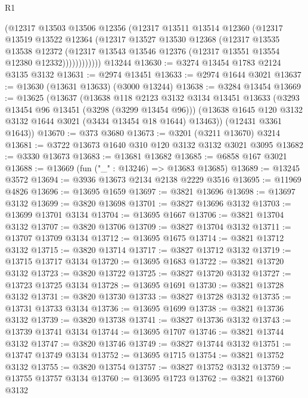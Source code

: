 \begin{lexlean}{R1}
\begin{coremodule}
              (@12317
                @13503
                @13506
                @12356
                (@12317
                  @13511
                  @13514
                  @12360
                  (@12317
                    @13519
                    @13522
                    @12364
                    (@12317
                      @13527
                      @13530
                      @12368
                      (@12317
                        @13535
                        @13538
                        @12372
                        (@12317 @13543 @13546 @12376 (@12317 @13551 @13554 @12380 @12332))))))))))))
    @13244
@13630 := @3274 @13454 @1783 @2124 @3135 @3132
@13631 := @2974 @13451
@13633 := @2974 @1644 @3021
@13637 := @13630 (@13631 @13633) (@3000 @13244)
@13638 := @3284 @13454
@13669 := @13625
    (@13637
      (@13638
        @118
        @2123
        @3132
        @3134
        @13451
        @13633
        (@3293 @13454 @96 @13451 (@3298 (@3299 @13454 @96)))
        (@13638 @1645 @120 @3132 @3132 @1644 @3021 (@3434 @13454 @18 @1644) @13463))
      (@12431 @3361 @1643))
@13670 := @373 @3680
@13673 := @3201 (@3211 @13670) @3214
@13681 := @3722 @13673 @1640 @310 @120 @3132 @3132 @3021 @3095
@13682 := @3330 @13673
@13683 := @13681 @13682
@13685 := @6858 @167 @3021
@13688 := @13669 (fun ("_" : @13246) => @13683 @13685)
@13689 := @13245 @3572
@13694 := @3936 @13673 @2134 @2138 @2229 @3516
@13695 := @11969 @4826
@13696 := @13695 @1659
@13697 := @3821 @13696
@13698 := @13697 @3132
@13699 := @3820 @13698
@13701 := @3827 @13696 @3132
@13703 := @13699 @13701 @3134
@13704 := @13695 @1667
@13706 := @3821 @13704 @3132
@13707 := @3820 @13706
@13709 := @3827 @13704 @3132
@13711 := @13707 @13709 @3134
@13712 := @13695 @1675
@13714 := @3821 @13712 @3132
@13715 := @3820 @13714
@13717 := @3827 @13712 @3132
@13719 := @13715 @13717 @3134
@13720 := @13695 @1683
@13722 := @3821 @13720 @3132
@13723 := @3820 @13722
@13725 := @3827 @13720 @3132
@13727 := @13723 @13725 @3134
@13728 := @13695 @1691
@13730 := @3821 @13728 @3132
@13731 := @3820 @13730
@13733 := @3827 @13728 @3132
@13735 := @13731 @13733 @3134
@13736 := @13695 @1699
@13738 := @3821 @13736 @3132
@13739 := @3820 @13738
@13741 := @3827 @13736 @3132
@13743 := @13739 @13741 @3134
@13744 := @13695 @1707
@13746 := @3821 @13744 @3132
@13747 := @3820 @13746
@13749 := @3827 @13744 @3132
@13751 := @13747 @13749 @3134
@13752 := @13695 @1715
@13754 := @3821 @13752 @3132
@13755 := @3820 @13754
@13757 := @3827 @13752 @3132
@13759 := @13755 @13757 @3134
@13760 := @13695 @1723
@13762 := @3821 @13760 @3132

\end{coremodule}
\end{lexlean}
